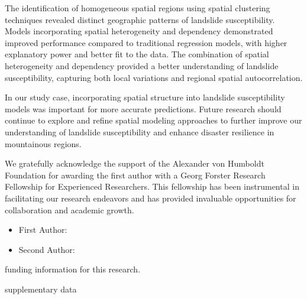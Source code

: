 \documentclass[
  manuscript=article,  
  layout=preprint,  
  year=2023,
  volume=0,
]{format}
\begin{document}
\par The identification of homogeneous spatial regions using spatial clustering techniques revealed distinct geographic patterns of landslide susceptibility. Models incorporating spatial heterogeneity and dependency demonstrated improved performance compared to traditional regression models, with higher explanatory power and better fit to the data. The combination of spatial heterogeneity and dependency provided a better understanding of landslide susceptibility, capturing both local variations and regional spatial autocorrelation.

\par In our study case, incorporating spatial structure into landslide susceptibility models was important for more accurate predictions. Future research should continue to explore and refine spatial modeling approaches to further improve our understanding of landslide susceptibility and enhance disaster resilience in mountainous regions.

\begin{acknowledgement}
We gratefully acknowledge the support of the Alexander von Humboldt Foundation for awarding the first author with a Georg Forster Research Fellowship for Experienced Researchers. This fellowship has been instrumental in facilitating our research endeavors and has provided invaluable opportunities for collaboration and academic growth.
\end{acknowledgement}

\begin{credit}

  \begin{itemize}
    \item First Author: 
    \item Second Author: 
  \end{itemize}
\end{credit}

\begin{funding}
  funding information for this research.
\end{funding}

\begin{opendata}
supplementary data
\end{opendata}

\printbibliography
\end{document}
